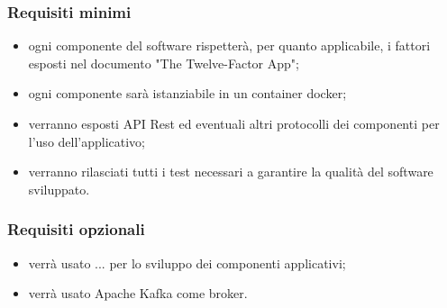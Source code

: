 		\subsubsection{Requisiti minimi}
            \begin{itemize}
                \item ogni componente del software rispetterà, per quanto applicabile, i fattori esposti nel documento "The Twelve-Factor App";
                \item ogni componente sarà istanziabile in un container docker;
                \item verranno esposti API Rest ed eventuali altri protocolli dei componenti per l'uso dell'applicativo;
                \item verranno rilasciati tutti i test necessari a garantire la qualità del software sviluppato.
            \end{itemize}
	
		\subsubsection{Requisiti opzionali}
		    \begin{itemize}
                \item verrà usato ... per lo sviluppo dei componenti applicativi;
                \item verrà usato Apache Kafka come broker.
            \end{itemize}
